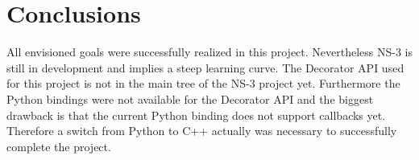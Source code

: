 
\section{Conclusions}

All envisioned goals were successfully realized in this project. Nevertheless
NS-3 is still in development and implies a steep learning curve. The
Decorator API used for this project is not in the main tree of the
NS-3 project yet. Furthermore the Python bindings were not available
for the Decorator API and the biggest drawback is that the current
Python binding does not support callbacks yet. Therefore a switch
from Python to C++ actually was necessary to successfully complete
the project.
